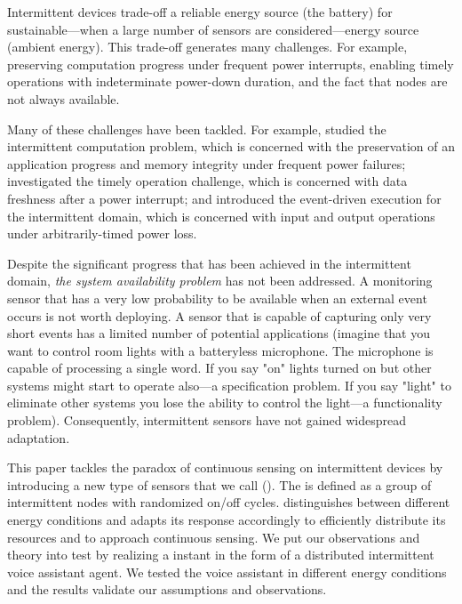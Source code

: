 Intermittent devices trade-off a reliable energy source (the battery) for sustainable---when a large number of sensors are considered---energy source (ambient energy). This trade-off generates many challenges. For example, preserving computation progress under frequent power interrupts, enabling timely operations with indeterminate power-down duration, and the fact that nodes are not always available. 
%

Many of these challenges have been tackled. For example, \cite{mementos,dino,colin2016chain} studied the intermittent computation problem, which is concerned with the preservation of an application progress and memory integrity under frequent power failures; \cite{hester2017timely} investigated the timely operation challenge, which is concerned with data freshness after a power interrupt; and \cite{yildirim2018ink, samoyed_pldi_2019} introduced the event-driven execution for the intermittent domain, which is concerned with input and output operations under arbitrarily-timed power loss.%

Despite the significant progress that has been achieved in the intermittent domain, \textit{the system availability problem} has not been addressed. A monitoring sensor that has a very low probability to be available when an external event occurs is not worth deploying. A sensor that is capable of capturing only very short events has a limited number of potential applications (imagine that you want to control room lights with a batteryless microphone. The microphone is capable of processing a single word. If you say "on" lights turned on but other systems might start to operate also---a specification problem. If you say "light" to eliminate other systems you lose the ability to control the light---a functionality problem). Consequently, intermittent sensors have not gained widespread adaptation. 

This paper tackles the paradox of continuous sensing on intermittent devices by introducing a new type of sensors that we call \textit{\fullsys} (\sys). The \sys is defined as a group of intermittent nodes with randomized on/off cycles. \sys distinguishes between different energy conditions and adapts its response accordingly to efficiently distribute its resources and to approach continuous sensing. We put our observations and theory into test by realizing a \sys instant in the form of a distributed intermittent voice assistant agent. We tested the voice assistant in different energy conditions and the results validate our assumptions and observations. 

